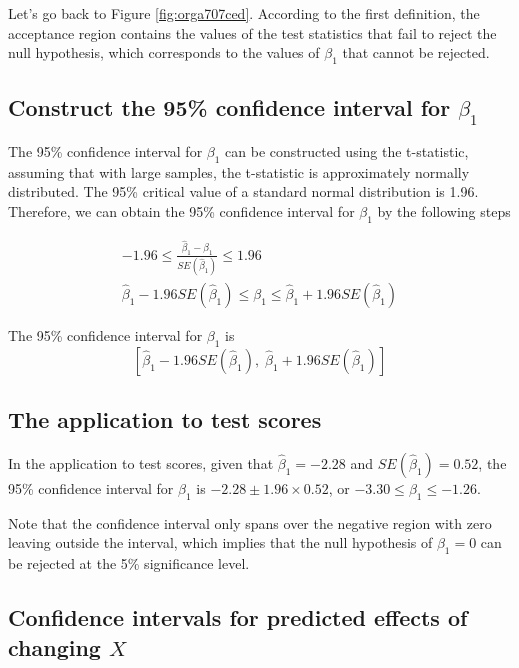 \documentclass[a4paper,11pt]{article}
\begin{document}
Let's go back to Figure \ref{fig:orga707ced}. According to the first
definition, the acceptance region contains the values of the
test statistics that fail to reject the null hypothesis,
which corresponds to the values of \(\beta_1\) that cannot be rejected. 


\subsection{Construct the 95\% confidence interval for \(\beta_1\)}
\label{sec:org110ede6}

The 95\% confidence interval for \(\beta_1\) can be constructed using the
t-statistic, assuming that with large samples, the t-statistic is
approximately normally distributed. The 95\% critical value of a
standard normal distribution is 1.96. Therefore, we can obtain the 95\%
confidence interval for \(\beta_1\) by the following steps

\begin{gather*}
-1.96 \leq \frac{\hat{\beta}_1 - \beta_1}{SE(\hat{\beta}_1)} \leq 1.96 \\
\hat{\beta}_1 - 1.96 SE(\hat{\beta}_1) \leq \beta_1 \leq \hat{\beta}_1 + 1.96 SE(\hat{\beta}_1)
\end{gather*}

The 95\% confidence interval for \(\beta_1\) is 
\[ \left[ \hat{\beta}_1 - 1.96 SE(\hat{\beta}_1),\; \hat{\beta}_1 + 1.96
SE(\hat{\beta}_1) \right] \]


\subsection{The application to test scores}
\label{sec:org13df726}

In the application to test scores, given that \(\hat{\beta}_1 = -2.28\)
and \(SE(\hat{\beta}_1) = 0.52\), the 95\% confidence interval for
\(\beta_1\) is \({-2.28 \pm 1.96 \times 0.52}\), or \(-3.30 \leq \beta_1
\leq -1.26\). 

Note that the confidence interval only spans over the negative
region with zero leaving outside the interval, which implies that the
null hypothesis of \(\beta_1 = 0\) can be rejected at the 5\%
significance level.


\subsection{Confidence intervals for predicted effects of changing \(X\)}
\label{sec:orgc6c293b}
\end{document}
